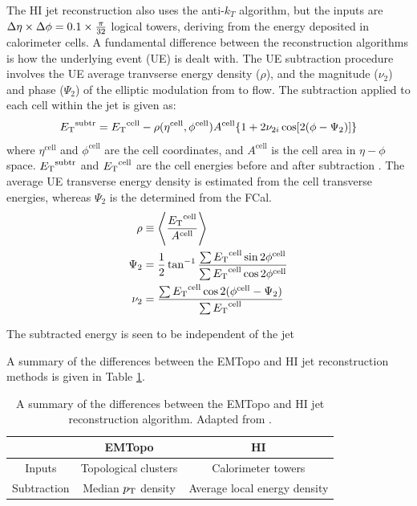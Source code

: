 The HI jet reconstruction also uses the anti-$k_{T}$ algorithm, but the inputs are $\mbox{$\Delta \eta$} \times \mbox{$\Delta \phi$} = 0.1 \times \frac{\pi}{32}$ logical towers, deriving from the energy deposited in calorimeter cells. A fundamental difference between the reconstruction algorithms is how the underlying event (UE) is dealt with. The UE subtraction procedure involves the UE average tranvserse energy density ($\rho$), and the magnitude ($\nu_{2}$) and phase ($\Psi_{2}$) of the elliptic modulation from to flow. The subtraction applied to each cell within the jet is given as: 
\begin{align}
\mbox{$E_{\mathrm{T}}$}^{\mathrm{subtr}} = \mbox{$E_{\mathrm{T}}$}^{\mathrm{cell}} - \rho(\eta^{\mathrm{cell}},\phi^{\mathrm{cell}})A^{\mathrm{cell}} \{1 + 2\nu_{2 i}\cos[2(\phi - \Psi_2)]\}
\end{align}
where $\eta^{\mathrm{cell}}$ and $\phi^{\mathrm{cell}}$ are the cell coordinates, and $A^{\mathrm{cell}}$ is the cell area in $\eta-\phi$ space. $\mbox{$E_{\mathrm{T}}$}^{\mathrm{subtr}}$ and $ \mbox{$E_{\mathrm{T}}$}^{\mathrm{cell}}$ are the cell energies before and after subtraction \cite{HIjesnote}. The average UE transverse energy density is estimated from the cell transverse energies, whereas $\Psi_2$ is the determined from the FCal.
\begin{align}
\rho &\equiv \left\langle \frac{\mbox{$E_{\mathrm{T}}$}^{\mathrm{cell}}}{A^{\mathrm{cell}}}\right\rangle \\
\Psi_2 &= \frac{1}{2} \tan^{-1}\frac{\sum \mbox{$E_{\mathrm{T}}$}^{\mathrm{cell}} \sin 2\phi^{\mathrm{cell}} }{\sum \mbox{$E_{\mathrm{T}}$}^{\mathrm{cell}} \cos 2\phi^{\mathrm{cell}} } \\
\nu_2 &= \frac{\sum \mbox{$E_{\mathrm{T}}$}^{\mathrm{cell}} \cos 2(\phi^{\mathrm{cell}} - \Psi_2) }{\sum \mbox{$E_{\mathrm{T}}$}^{\mathrm{cell}}}
\end{align}

The subtracted energy is seen to be independent of the jet\ \Et \ 



A summary of the differences between the EMTopo and HI jet reconstruction methods is given in Table \ref{table:algo_diff}.
\begin{table}[h]
\centering
\caption{A summary of the differences between the EMTopo and HI jet reconstruction algorithm. Adapted from \cite{HIjesnote}.}
\begin{tabular}{|c|c|c|}
\hline
            & EMTopo                 & HI                           \\ \hline
Inputs      & Topological clusters   & Calorimeter towers           \\ \hline
Subtraction & Median $\mbox{$p_{\mathrm{T}}$}$ density & Average local energy density \\ \hline
\end{tabular}
\label{table:algo_diff}
\end{table}




